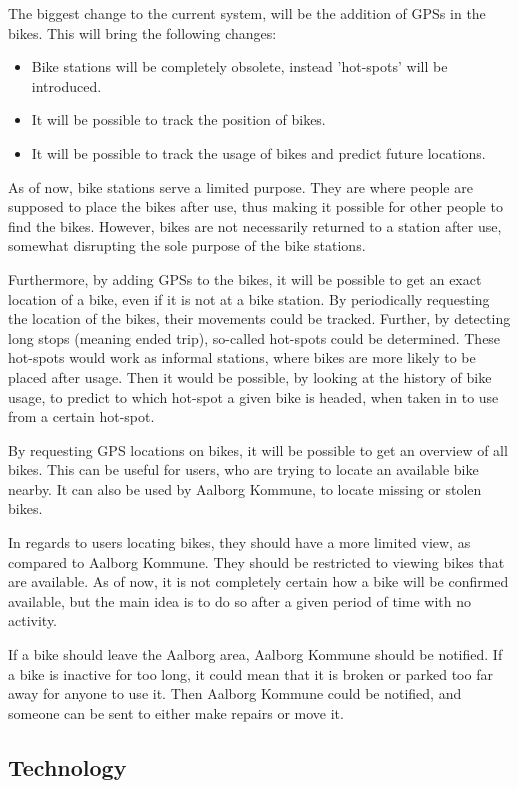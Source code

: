 The biggest change to the current system, will be the addition of GPSs in the bikes.
This will bring the following changes:
\begin{itemize}
\item Bike stations will be completely obsolete, instead 'hot-spots' will be introduced.
\item It will be possible to track the position of bikes.
\item It will be possible to track the usage of bikes and predict future locations.
\end{itemize}

As of now, bike stations serve a limited purpose.
They are where people are supposed to place the bikes after use, thus making it possible for other people to find the bikes.
However, bikes are not necessarily returned to a station after use, somewhat disrupting the sole purpose of the bike stations.

Furthermore, by adding GPSs to the bikes, it will be possible to get an exact location of a bike, even if it is not at a bike station.
By periodically requesting the location of the bikes, their movements could be tracked.
Further, by detecting long stops (meaning ended trip), so-called hot-spots could be determined.
These hot-spots would work as informal stations, where bikes are more likely to be placed after usage.
Then it would be possible, by looking at the history of bike usage, to predict to which hot-spot a given bike is headed, when taken in to use from a certain hot-spot.

By requesting GPS locations on bikes, it will be possible to get an overview of all bikes.
This can be useful for users, who are trying to locate an available bike nearby.
It can also be used by Aalborg Kommune, to locate missing or stolen bikes.

In regards to users locating bikes, they should have a more limited view, as compared to Aalborg Kommune.
They should be restricted to viewing bikes that are available.
As of now, it is not completely certain how a bike will be confirmed available, but the main idea is to do so after a given period of time with no activity.

If a bike should leave the Aalborg area, Aalborg Kommune should be notified.
If a bike is inactive for too long, it could mean that it is broken or parked too far away for anyone to use it.
Then Aalborg Kommune could be notified, and someone can be sent to either make repairs or move it.

\subsection{Technology}

